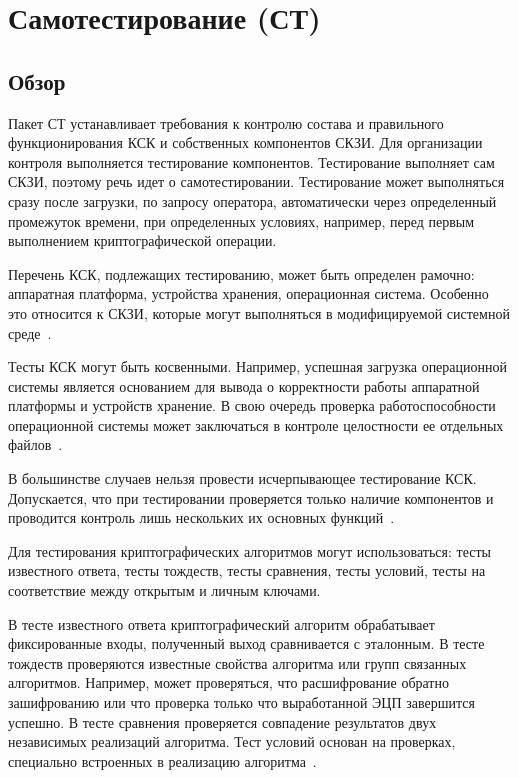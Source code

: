 \section{Самотестирование (СТ)}\label{ST}

\subsection{Обзор}\label{ST.Intro}

Пакет СТ устанавливает требования к контролю состава
и правильного функционирования КСК и собственных компонентов СКЗИ.
%
Для организации контроля выполняется тестирование компонентов.
%
Тестирование выполняет сам СКЗИ, поэтому речь идет о самотестировании.
Тестирование может выполняться сразу после загрузки,
по запросу оператора, автоматически через определенный промежуток времени,
при определенных условиях, например, перед первым выполнением криптографической 
операции.

Перечень КСК, подлежащих тестированию, может быть определен рамочно:
аппаратная платформа, устройства хранения, операционная система. 
Особенно это относится к СКЗИ, которые могут выполняться в модифицируемой 
системной среде~.

Тесты КСК могут быть косвенными. Например, успешная загрузка операционной 
системы является основанием для вывода о корректности работы аппаратной 
платформы и устройств хранение. В свою очередь проверка работоспособности 
операционной системы может заключаться в контроле целостности ее отдельных 
файлов~.  

В большинстве случаев нельзя провести исчерпывающее тестирование КСК. 
Допускается, что при тестировании проверяется только 
наличие компонентов и проводится контроль лишь нескольких их основных 
функций~.

Для тестирования криптографических алгоритмов могут использоваться:
тесты известного ответа, тесты тождеств, тесты сравнения, тесты условий, 
тесты на соответствие между открытым и личным ключами. 

В тесте известного ответа криптографический алгоритм обрабатывает
фиксированные входы, полученный выход сравнивается с эталонным.
%
В тесте тождеств проверяются известные свойства алгоритма  
или групп связанных алгоритмов. Например, может проверяться, что расшифрование 
обратно зашифрованию или что проверка только что выработанной ЭЦП завершится 
успешно.
%
В тесте сравнения проверяется совпадение результатов двух независимых
реализаций алгоритма.
%
Тест условий основан на проверках, специально встроенных в реализацию 
алгоритма~.

